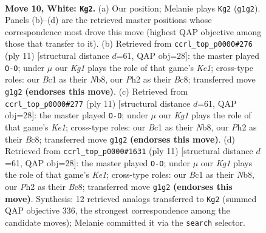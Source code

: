 \documentclass[11pt]{article}
\begin{document}
\clearpage

\begin{figure}[p]\centering
\begin{subfigure}{0.46\textwidth}\centering
\resizebox{\linewidth}{!}{%
\newchessgame
\chessboard[
  setfen={rnbq1rk1/1p2bpp1/5n2/p1pp3p/8/1P2PNPB/P2P1P1P/RNBQ1RK1 w - - 0 10},
  showmover=false,
  pgfstyle=straightmove, color=movearrow, markmove={g1-g2}
]}
\caption{}
\end{subfigure}\hfill
\begin{subfigure}{0.46\textwidth}\centering
\resizebox{\linewidth}{!}{%
\newchessgame
\chessboard[
  setfen={rnbqk2r/pp2ppbp/2p2np1/3p4/2PP4/5NP1/PP2PPBP/RNBQ1RK1 b kq - 3 6},
  showmover=false,
  pgfstyle=straightmove, color=movearrow, markmove={e8-g8}
]}
\caption{}
\end{subfigure}
\\[4pt]
\begin{subfigure}{0.46\textwidth}\centering
\resizebox{\linewidth}{!}{%
\newchessgame
\chessboard[
  setfen={rnbqk2r/pp2ppbp/2p2np1/3p4/2PP4/5NP1/PP2PPBP/RNBQ1RK1 b kq - 3 6},
  showmover=false,
  pgfstyle=straightmove, color=movearrow, markmove={e8-g8}
]}
\caption{}
\end{subfigure}\hfill
\begin{subfigure}{0.46\textwidth}\centering
\resizebox{\linewidth}{!}{%
\newchessgame
\chessboard[
  setfen={rnbqk2r/pp2ppbp/2p2np1/3p4/2PP4/5NP1/PP2PPBP/RNBQ1RK1 b kq - 3 6},
  showmover=false,
  pgfstyle=straightmove, color=movearrow, markmove={e8-g8}
]}
\caption{}
\end{subfigure}
\caption{\textbf{Move 10, White: \texttt{Kg2}.} (a) Our position; Melanie plays \texttt{Kg2} (\texttt{g1g2}). Panels (b)--(d) are the retrieved master positions whose correspondence most drove this move (highest QAP objective among those that transfer to it). (b) Retrieved from \texttt{ccrl\_top\_p0000\#276} (ply 11) [structural distance $d$=61, QAP obj=28]: the master played \texttt{O-O}; under $\mu$ our \emph{Kg1} plays the role of that game's \emph{Ke1}; cross-type roles: our \emph{B}c1 as their \emph{N}b8, our \emph{P}h2 as their \emph{B}c8; transferred move \texttt{g1g2} \textbf{(endorses this move)}. (c) Retrieved from \texttt{ccrl\_top\_p0000\#277} (ply 11) [structural distance $d$=61, QAP obj=28]: the master played \texttt{O-O}; under $\mu$ our \emph{Kg1} plays the role of that game's \emph{Ke1}; cross-type roles: our \emph{B}c1 as their \emph{N}b8, our \emph{P}h2 as their \emph{B}c8; transferred move \texttt{g1g2} \textbf{(endorses this move)}. (d) Retrieved from \texttt{ccrl\_top\_p0000\#1631} (ply 11) [structural distance $d$=61, QAP obj=28]: the master played \texttt{O-O}; under $\mu$ our \emph{Kg1} plays the role of that game's \emph{Ke1}; cross-type roles: our \emph{B}c1 as their \emph{N}b8, our \emph{P}h2 as their \emph{B}c8; transferred move \texttt{g1g2} \textbf{(endorses this move)}. Synthesis: 12 retrieved analogs transferred to \texttt{Kg2} (summed QAP objective 336, the strongest correspondence among the candidate moves); Melanie committed it via the \texttt{search} selector.}
\label{fig:thought-m18}
\end{figure}
\end{document}
